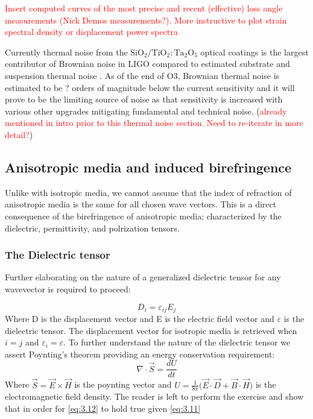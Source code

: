 \textcolor{red}{Insert computed curves of the most precise and recent (effective) loss angle measurements (Nick Demos measurements?). More instructive to plot strain spectral density or displacement power spectra}

\noindent Currently thermal noise from the $\mathrm{SiO_2}/\mathrm{TiO_2:Ta_2O_5}$ optical coatings is the largest contributor of Brownian noise in LIGO compared to estimated substrate and suspension thermal noise \cite{Harry:06}. As of the end of O3, Brownian thermal noise is estimated to be ? orders of magnitude below the current sensitivity and it will prove to be the limiting source of noise as that sensitivity is increased with various other upgrades mitigating fundamental and technical noise. (\textcolor{red}{already mentioned in intro prior to this thermal noise section. Need to re-iterate in more detail?})

\subsection{Anisotropic media and induced birefringence}
Unlike with isotropic media, we cannot assume that the index of refraction of anisotropic media is the same for all chosen wave vectors. This is a direct consequence of the birefringence of anisotropic media; characterized by the dielectric, permittivity, and polrization tensors.

\subsubsection{The Dielectric tensor}
Further elaborating on the nature of a generalized dielectric tensor for any wavevector is required to proceed:

\begin{equation}\label{eq:3.11}
D_i = \varepsilon_{ij}E_j
\end{equation}
Where D is the displacement vector and E is the electric field vector and $\varepsilon$ is the dielectric tensor. The displacement vector for isotropic media is retrieved when $i = j$ and $\varepsilon_i = \varepsilon$. To further understand the nature of the dielectric tensor we assert Poynting's theorem providing an energy conservation requirement:
\begin{equation}\label{eq:3.12}
\nabla \cdot \vec{S} = \frac{dU}{dt}
\end{equation}
Where $\vec{S} = \vec{E} \times \vec{H}$ is the poynting vector and $U = \frac{1}{8 \pi} \big( \vec{E} \cdot \vec{D} + \vec{B} \cdot \vec{H} \big)$ is the electromagnetic field density. The reader is left to perform the exercise and show that in order for \ref{eq:3.12} to hold true given \ref{eq:3.11}

